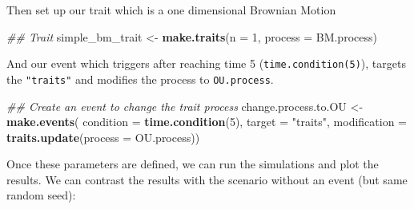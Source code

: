 \documentclass[
]{book}
\newenvironment{Shaded}{\begin{snugshade}}{\end{snugshade}}
\newcommand{\CommentTok}[1]{\textcolor[rgb]{0.56,0.35,0.01}{\textit{#1}}}
\newcommand{\DataTypeTok}[1]{\textcolor[rgb]{0.13,0.29,0.53}{#1}}
\newcommand{\DecValTok}[1]{\textcolor[rgb]{0.00,0.00,0.81}{#1}}
\newcommand{\KeywordTok}[1]{\textcolor[rgb]{0.13,0.29,0.53}{\textbf{#1}}}
\newcommand{\NormalTok}[1]{#1}
\newcommand{\StringTok}[1]{\textcolor[rgb]{0.31,0.60,0.02}{#1}}
\begin{document}
Then set up our trait which is a one dimensional Brownian Motion

\begin{Shaded}
\begin{Highlighting}[]
\CommentTok{\#\# Trait}
\NormalTok{simple\_bm\_trait \textless{}{-}}\StringTok{ }\KeywordTok{make.traits}\NormalTok{(}\DataTypeTok{n =} \DecValTok{1}\NormalTok{, }\DataTypeTok{process =}\NormalTok{ BM.process)}
\end{Highlighting}
\end{Shaded}

And our event which triggers after reaching time 5 (\texttt{time.condition(5)}), targets the \texttt{"traits"} and modifies the process to \texttt{OU.process}.

\begin{Shaded}
\begin{Highlighting}[]
\CommentTok{\#\# Create an event to change the trait process}
\NormalTok{change.process.to.OU \textless{}{-}}\StringTok{ }\KeywordTok{make.events}\NormalTok{(}
                  \DataTypeTok{condition    =} \KeywordTok{time.condition}\NormalTok{(}\DecValTok{5}\NormalTok{),}
                  \DataTypeTok{target       =} \StringTok{"traits"}\NormalTok{,}
                  \DataTypeTok{modification =} \KeywordTok{traits.update}\NormalTok{(}\DataTypeTok{process =}\NormalTok{ OU.process))}
\end{Highlighting}
\end{Shaded}

Once these parameters are defined, we can run the simulations and plot the results.
We can contrast the results with the scenario without an event (but same random seed):
\end{document}
